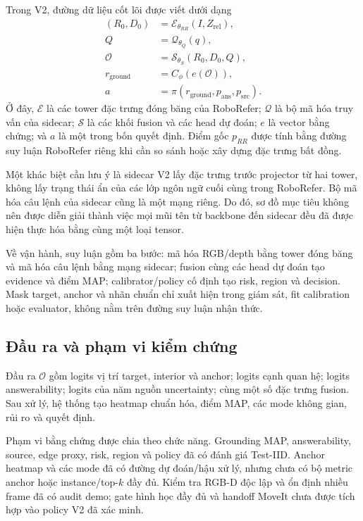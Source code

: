 Trong V2, đường dữ liệu cốt lõi được viết dưới dạng
\begin{align}
    (R_0,D_0)&=\mathcal{E}_{\theta_{RR}}(I,Z_{\mathrm{rel}}),\\
    Q&=\mathcal{Q}_{\theta_Q}(q),\\
    \mathcal{O}&=\mathcal{S}_{\theta_S}(R_0,D_0,Q),\\
    r_{\mathrm{ground}}&=C_{\phi}(e(\mathcal{O})),\\
    a&=\pi(r_{\mathrm{ground}},p_{\mathrm{ans}},p_{\mathrm{src}}).
\end{align}
Ở đây, $\mathcal{E}$ là các tower đặc trưng đóng băng của RoboRefer;
$\mathcal{Q}$ là bộ mã hóa truy vấn của sidecar; $\mathcal{S}$ là các
khối fusion và các head dự đoán; $e$ là vector bằng chứng; và $a$ là một
trong bốn quyết định. Điểm gốc $p_{RR}$ được tính bằng đường suy luận
RoboRefer riêng khi cần so sánh hoặc xây dựng đặc trưng bất đồng.

Một khác biệt cần lưu ý là sidecar V2 lấy đặc trưng trước projector từ
hai tower, không lấy trạng thái ẩn của các lớp ngôn ngữ cuối cùng trong
RoboRefer. Bộ mã hóa câu lệnh của sidecar cũng là một mạng riêng.
Do đó, sơ đồ mục tiêu không nên được diễn giải thành việc mọi mũi tên
từ backbone đến sidecar đều đã được hiện thực hóa bằng cùng một loại tensor.

Về vận hành, suy luận gồm ba bước: mã hóa RGB/depth bằng tower đóng băng
và mã hóa câu lệnh bằng mạng sidecar; fusion cùng các head dự đoán tạo
evidence và điểm MAP; calibrator/policy cố định tạo risk, region và
decision. Mask target, anchor và nhãn chuẩn chỉ xuất hiện trong giám sát,
fit calibration hoặc evaluator, không nằm trên đường suy luận nhận thức.

\subsection{Đầu ra và phạm vi kiểm chứng}

Đầu ra $\mathcal{O}$ gồm logits vị trí target, interior và anchor; logits
cạnh quan hệ; logits answerability; logits của năm nguồn uncertainty;
cùng một số đặc trưng fusion. Sau xử lý, hệ thống tạo heatmap chuẩn hóa,
điểm MAP, các mode không gian, rủi ro và quyết định.

Phạm vi bằng chứng được chia theo chức năng. Grounding MAP, answerability,
source, edge proxy, risk, region và policy đã có đánh giá Test-IID.
Anchor heatmap và các mode đã có đường dự đoán/hậu xử lý, nhưng chưa có
bộ metric anchor hoặc instance/top-$k$ đầy đủ. Kiểm tra RGB-D độc lập và
ổn định nhiều frame đã có audit demo; gate hình học đầy đủ và handoff
MoveIt chưa được tích hợp vào policy V2 đã xác minh.

